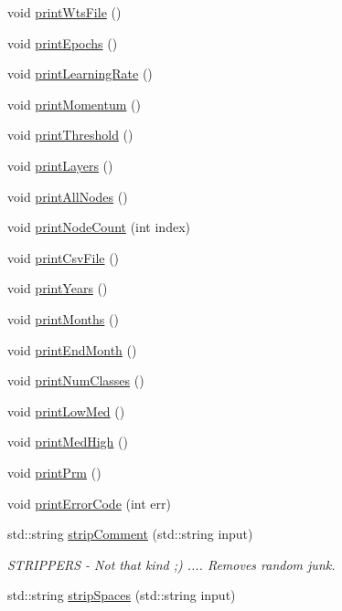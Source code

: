 \begin{DoxyCompactItemize}
void \hyperlink{classPrm_af0c4bd037982056f86597e002f3f432f}{print\-Wts\-File} ()
\item 
void \hyperlink{classPrm_a234c748d8d2eb0ed5e90a4888b20e97d}{print\-Epochs} ()
\item 
void \hyperlink{classPrm_ad595f033ede3bdea5851b06aa48507a7}{print\-Learning\-Rate} ()
\item 
void \hyperlink{classPrm_a26e6ad5f9b4d59aecae168a8c94f0866}{print\-Momentum} ()
\item 
void \hyperlink{classPrm_aab8f1acaec1480e79ee2abdf41197785}{print\-Threshold} ()
\item 
void \hyperlink{classPrm_a5f187d1ca951065867a2ea3999bfd1ec}{print\-Layers} ()
\item 
void \hyperlink{classPrm_a320c6a41ea4415a979ce18c89ea3a330}{print\-All\-Nodes} ()
\item 
void \hyperlink{classPrm_a7b12b30a4ae137fe035e91681b79c61c}{print\-Node\-Count} (int index)
\item 
void \hyperlink{classPrm_a7fb18166e0c062d2e243d13c966e197e}{print\-Csv\-File} ()
\item 
void \hyperlink{classPrm_a30917a16a42f1550eaea3dcff45f1ac4}{print\-Years} ()
\item 
void \hyperlink{classPrm_a9c2a7e5aac8359d54f6e191e098c54e3}{print\-Months} ()
\item 
void \hyperlink{classPrm_a261c76671548abf05c190ccc01d4721e}{print\-End\-Month} ()
\item 
void \hyperlink{classPrm_a87c9f9ab6dde1e7a91993bda4dbb36d5}{print\-Num\-Classes} ()
\item 
void \hyperlink{classPrm_a66ac4009f629c6c11989b107e06f64b8}{print\-Low\-Med} ()
\item 
void \hyperlink{classPrm_ac62b14bce152ea1837c006b53d393c90}{print\-Med\-High} ()
\item 
void \hyperlink{classPrm_a37e160a85bf7f3b225321958d3687503}{print\-Prm} ()
\item 
void \hyperlink{classPrm_a5b8d160d8ab212f09ea9070a313cca6d}{print\-Error\-Code} (int err)
\item 
std\-::string \hyperlink{classPrm_a9a8b6a6dd547159f794499a798e2305e}{strip\-Comment} (std\-::string input)
\begin{DoxyCompactList}\small\item\em S\-T\-R\-I\-P\-P\-E\-R\-S -\/ Not that kind ;) .... Removes random junk. \end{DoxyCompactList}\item 
std\-::string \hyperlink{classPrm_afc4f884eefec9b35378f31fbc4ffdda4}{strip\-Spaces} (std\-::string input)
\end{DoxyCompactItemize}


